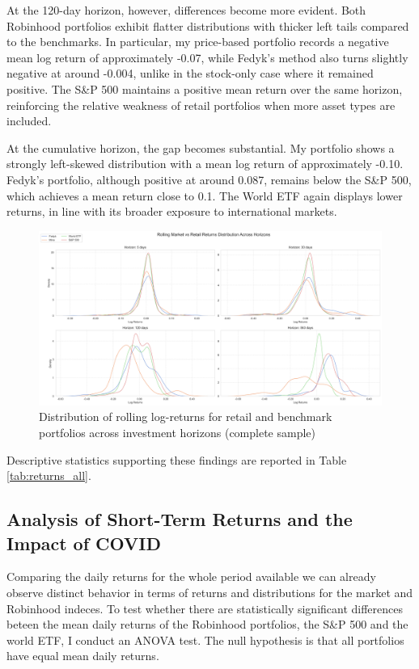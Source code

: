 At the 120-day horizon, however, differences become more evident. 
Both Robinhood portfolios exhibit flatter distributions with thicker left tails compared to the benchmarks. 
In particular, my price-based portfolio records a negative mean log return of approximately -0.07, while Fedyk’s method also turns slightly negative at around -0.004, unlike in the stock-only case where it remained positive. 
The S\&P 500 maintains a positive mean return over the same horizon, reinforcing the relative weakness of retail portfolios when more asset types are included.

At the cumulative horizon, the gap becomes substantial. My portfolio shows a strongly left-skewed distribution with a mean log return of approximately -0.10.
Fedyk’s portfolio, although positive at around 0.087, remains below the S\&P 500, which achieves a mean return close to 0.1. 
The World ETF again displays lower returns, in line with its broader exposure to international markets.
\begin{figure}[h!]
    \centering
    \includegraphics[width=1\linewidth]
    {../images/distributions/comparison_2.png}
    \caption{Distribution of rolling log-returns for retail and benchmark portfolios across investment horizons (complete sample)}
\end{figure}

Descriptive statistics supporting these findings are reported in Table \ref{tab:returns_all}.

\subsection{Analysis of Short-Term Returns and the Impact of COVID}
Comparing the daily returns for the whole period available we can already observe distinct behavior in terms of returns and distributions for the market and Robinhood indeces.
To test whether there are statistically significant differences beteen the mean daily returns of the Robinhood portfolios, the S\&P 500 and the world ETF, I conduct an ANOVA test.
The null hypothesis is that all portfolios have equal mean daily returns.

